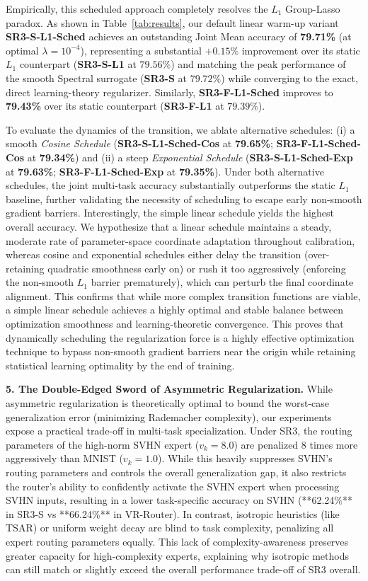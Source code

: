 Empirically, this scheduled approach completely resolves the $L_1$ Group-Lasso paradox. As shown in Table~\ref{tab:results}, our default linear warm-up variant \textbf{SR3-S-L1-Sched} achieves an outstanding Joint Mean accuracy of \textbf{79.71\%} (at optimal $\lambda = 10^{-4}$), representing a substantial $+0.15\%$ improvement over its static $L_1$ counterpart (\textbf{SR3-S-L1} at $79.56\%$) and matching the peak performance of the smooth Spectral surrogate (\textbf{SR3-S} at $79.72\%$) while converging to the exact, direct learning-theory regularizer. Similarly, \textbf{SR3-F-L1-Sched} improves to \textbf{79.43\%} over its static counterpart (\textbf{SR3-F-L1} at $79.39\%$). 

To evaluate the dynamics of the transition, we ablate alternative schedules: (i) a smooth \emph{Cosine Schedule} (\textbf{SR3-S-L1-Sched-Cos} at \textbf{79.65\%}; \textbf{SR3-F-L1-Sched-Cos} at \textbf{79.34\%}) and (ii) a steep \emph{Exponential Schedule} (\textbf{SR3-S-L1-Sched-Exp} at \textbf{79.63\%}; \textbf{SR3-F-L1-Sched-Exp} at \textbf{79.35\%}). Under both alternative schedules, the joint multi-task accuracy substantially outperforms the static $L_1$ baseline, further validating the necessity of scheduling to escape early non-smooth gradient barriers. Interestingly, the simple linear schedule yields the highest overall accuracy. We hypothesize that a linear schedule maintains a steady, moderate rate of parameter-space coordinate adaptation throughout calibration, whereas cosine and exponential schedules either delay the transition (over-retaining quadratic smoothness early on) or rush it too aggressively (enforcing the non-smooth $L_1$ barrier prematurely), which can perturb the final coordinate alignment. This confirms that while more complex transition functions are viable, a simple linear schedule achieves a highly optimal and stable balance between optimization smoothness and learning-theoretic convergence. This proves that dynamically scheduling the regularization force is a highly effective optimization technique to bypass non-smooth gradient barriers near the origin while retaining statistical learning optimality by the end of training.

\textbf{5. The Double-Edged Sword of Asymmetric Regularization.}
While asymmetric regularization is theoretically optimal to bound the worst-case generalization error (minimizing Rademacher complexity), our experiments expose a practical trade-off in multi-task specialization. Under SR3, the routing parameters of the high-norm SVHN expert ($v_k = 8.0$) are penalized 8 times more aggressively than MNIST ($v_k = 1.0$). While this heavily suppresses SVHN's routing parameters and controls the overall generalization gap, it also restricts the router's ability to confidently activate the SVHN expert when processing SVHN inputs, resulting in a lower task-specific accuracy on SVHN (**62.24\%** in SR3-S vs **66.24\%** in VR-Router). In contrast, isotropic heuristics (like TSAR) or uniform weight decay are blind to task complexity, penalizing all expert routing parameters equally. This lack of complexity-awareness preserves greater capacity for high-complexity experts, explaining why isotropic methods can still match or slightly exceed the overall performance trade-off of SR3 overall. 

